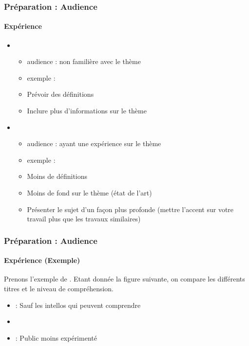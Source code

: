 \documentclass[xcolor=table, usenames,dvipsnames]{beamer}
\begin{document}
\begin{frame}
\frametitle{Préparation : Audience}
\framesubtitle{Expérience}

\begin{itemize}
	\item {}
	\begin{itemize}
		\item audience : non familière avec le thème
		\item exemple : 
		\item Prévoir des définitions 
		\item Inclure plus d'informations sur le thème
	\end{itemize}
	\item {}
	\begin{itemize}
		\item audience : ayant une expérience sur le thème
		\item exemple : 
		\item Moins de définitions 
		\item Moins de fond sur le thème (état de l'art)
		\item Présenter le sujet d'un façon plus profonde (mettre l'accent sur votre travail plus que les travaux similaires)
	\end{itemize}
\end{itemize}

\end{frame}

\begin{frame}
\frametitle{Préparation : Audience}
\framesubtitle{Expérience (Exemple)}

Prenons l'exemple de \cite{carlton-jacob}. Etant donnée la figure suivante, on compare les différents titres et le niveau de compréhension. 

\begin{minipage}{0.60\textwidth}
	\begin{itemize}
		\item {} : Sauf les intellos qui peuvent comprendre
		\item {}
		\item {} : Public moins expérimenté
	\end{itemize}
\end{minipage}
%
\begin{minipage}{0.39\textwidth}
\end{minipage}

\end{frame}
\end{document}
